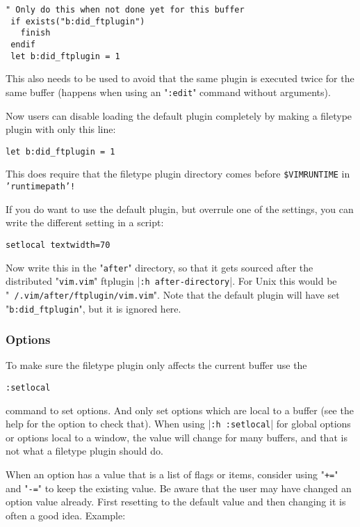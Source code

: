 \begin{Verbatim}[samepage=true]
 " Only do this when not done yet for this buffer
 if exists("b:did_ftplugin")
   finish
 endif
 let b:did_ftplugin = 1
\end{Verbatim}

This also needs to be used to avoid that the same plugin is executed twice for the same buffer (happens when using an "\texttt{:edit}" command without arguments).

Now users can disable loading the default plugin completely by making a filetype plugin with only this line:

\begin{Verbatim}[samepage=true]
 let b:did_ftplugin = 1
\end{Verbatim}

This does require that the filetype plugin directory comes before \texttt{\$VIMRUNTIME} in \texttt{'runtimepath'!}

If you do want to use the default plugin, but overrule one of the settings, you can write the different setting in a script:

\begin{Verbatim}[samepage=true]
 setlocal textwidth=70
\end{Verbatim}

Now write this in the "\texttt{after}" directory, so that it gets sourced after the distributed "\texttt{vim.vim}" ftplugin |\texttt{:h after-directory}|.
For Unix this would be "\texttt{~/.vim/after/ftplugin/vim.vim}".
Note that the default plugin will have set "\texttt{b:did\_ftplugin}", but it is ignored here.

\subsubsection{Options}
To make sure the filetype plugin only affects the current buffer use the

\begin{Verbatim}[samepage=true]
 :setlocal
\end{Verbatim}

command to set options.
And only set options which are local to a buffer (see the help for the option to check that).
When using |\texttt{:h :setlocal}| for global options or options local to a window, the value will change for many buffers, and that is not what a filetype plugin should do.

When an option has a value that is a list of flags or items, consider using "\texttt{+=}" and "\texttt{-=}" to keep the existing value.
Be aware that the user may have changed an option value already.
First resetting to the default value and then changing it is often a good idea.
Example:

